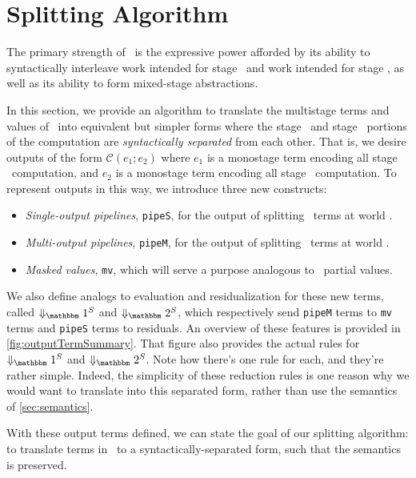 
\section{Splitting Algorithm}
\label{sec:splitting}

\begin{abstrsyn}

The primary strength of \lang\ is the expressive power afforded by
its ability to syntactically interleave work intended for stage \bbone\
and work intended for stage \bbtwo, as well as its ability to form
mixed-stage abstractions. 

In this section, we provide an algorithm to translate the multistage terms and values of \lang\
into equivalent but simpler forms where the stage \bbone\ and stage \bbtwo\ portions 
of the computation are {\em syntactically separated} from each other.
That is, we desire outputs of the form $\mathcal{C}(e_1;e_2)$ where  
$e_1$ is a monostage term encoding all stage \bbone\ computation, 
and $e_2$ is a monostage term encoding all stage \bbtwo\ computation.
To represent outputs in this way, we introduce three new constructs:
\begin{itemize}
\item {\em Single-output pipelines}, \texttt{pipeS}, for the output of splitting \lang\ terms at world \bbtwo.
\item {\em Multi-output pipelines}, \texttt{pipeM}, for the output of splitting \lang\ terms at world \bbonem. 
\item {\em Masked values}, \texttt{mv}, which will serve a purpose analogous to \lang\ partial values.
\end{itemize}

We also define analogs to evaluation and residualization for these new terms, 
called $\sepredonesym$ and $\sepredtwosym$, 
which respectively send \texttt{pipeM} terms to \texttt{mv} terms
and \texttt{pipeS} terms to residuals.
An overview of these features is provided in \ref{fig:outputTermSummary}.
That figure also provides the actual rules for $\sepredonesym$ and $\sepredtwosym$.
Note how there's one rule for each, and they're rather simple.
Indeed, the simplicity of these reduction rules is one reason why we 
would want to translate into this separated form, rather than use the semantics of \ref{sec:semantics}.

With these output terms defined, we can state the goal of our splitting algorithm:
to translate terms in \lang\ to a syntactically-separated form, 
such that the semantics is preserved.


\end{abstrsyn}
